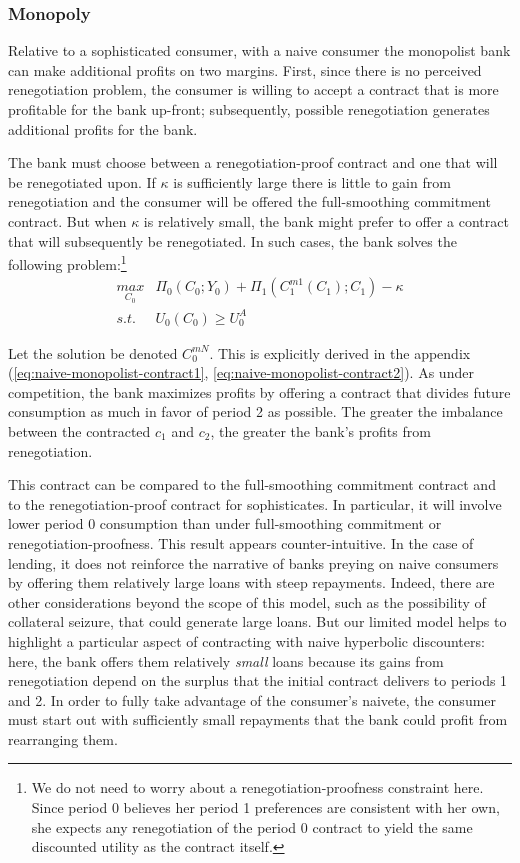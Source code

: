 \documentclass[11pt,english]{article}
\theoremstyle{plain}
\theoremstyle{definition}
\begin{document}
\subsubsection{Monopoly}

Relative to a sophisticated consumer, with a naive consumer the monopolist
bank can make additional profits on two margins. First, since there
is no perceived renegotiation problem, the consumer is willing to
accept a contract that is more profitable for the bank up-front; subsequently,
possible renegotiation generates additional profits for the bank.

The bank must choose between a renegotiation-proof contract and one
that will be renegotiated upon. If $\kappa$ is sufficiently large
there is little to gain from renegotiation and the consumer will be
offered the full-smoothing commitment contract. But when $\kappa$
is relatively small, the bank might prefer to offer a contract that
will subsequently be renegotiated. In such cases, the bank solves
the following problem:\footnote{We do not need to worry about a renegotiation-proofness constraint
here. Since period 0 believes her period 1 preferences are consistent
with her own, she expects any renegotiation of the period 0 contract
to yield the same discounted utility as the contract itself.} 
\begin{eqnarray}
\underset{C_{0}}{max} & \Pi_{0}\left(C_{0};Y_{0}\right)+\Pi_{1}\left(C_{1}^{m1}\left(C_{1}\right);C_{1}\right)-\kappa\nonumber \\
s.t. & U_{0}\left(C_{0}\right)\geq U_{0}^{A}\label{eq:pc-n}
\end{eqnarray}

Let the solution be denoted $C_{0}^{mN}$. This is explicitly derived
in the appendix (\ref{eq:naive-monopolist-contract1}, \ref{eq:naive-monopolist-contract2}).
As under competition, the bank maximizes profits by offering a contract
that divides future consumption as much in favor of period 2 as possible.
The greater the imbalance between the contracted $c_{1}$ and $c_{2}$,
the greater the bank's profits from renegotiation.

This contract can be compared to the full-smoothing commitment contract
and to the renegotiation-proof contract for sophisticates. In particular,
it will involve lower period 0 consumption than under full-smoothing
commitment or renegotiation-proofness. This result appears counter-intuitive.
In the case of lending, it does not reinforce the narrative of banks
preying on naive consumers by offering them relatively large loans
with steep repayments. Indeed, there are other considerations beyond
the scope of this model, such as the possibility of collateral seizure,
that could generate large loans. But our limited model helps to highlight
a particular aspect of contracting with naive hyperbolic discounters:
here, the bank offers them relatively \emph{small} loans because its
gains from renegotiation depend on the surplus that the initial contract
delivers to periods 1 and 2. In order to fully take advantage of the
consumer's naivete, the consumer must start out with sufficiently
small repayments that the bank could profit from rearranging them.
\end{document}
